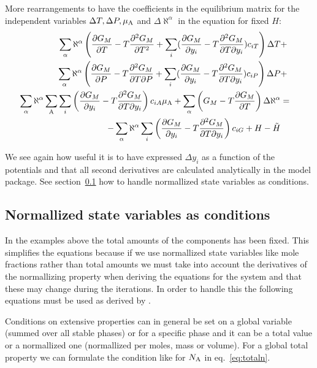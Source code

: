 \documentclass[12pt]{article}
\begin{document}
More rearrangements to have the coefficients in the equilibrium matrix
for the independent variables $\Delta T, \Delta P, \mu_{\rm A}$ and
$\Delta \aleph^{\alpha}$ in the equation for fixed $H$:
\begin{eqnarray}
\sum_{\alpha}\aleph^{\alpha}
\left(\frac{\partial G_M}{\partial T}-T\frac{\partial^2 G_M}{\partial T^2}+
\sum_i(\frac{\partial G_M}{\partial y_i}-T\frac{\partial^2 G_M}{\partial T\partial y_i}) c_{iT}\right)\Delta T&+&\nonumber\\
\sum_{\alpha}\aleph^{\alpha}
\left(\frac{\partial G_M}{\partial P}-T\frac{\partial^2 G_M}{\partial T\partial P}+
\sum_i(\frac{\partial G_M}{\partial y_i}-T\frac{\partial^2 G_M}{\partial T\partial y_i})c_{iP}\right)\Delta P&+&\nonumber\\
\sum_{\alpha}\aleph^{\alpha}
\sum_{\rm A}\sum_i\left(\frac{\partial G_M}{\partial y_i}-T\frac{\partial^2 G_M}{\partial T\partial y_i}\right)c_{iA}\mu_{\rm A}+
\sum_{\alpha}\left(G_M - T \frac{\partial G_M}{\partial T}\right) \Delta\aleph^{\alpha} &=&\nonumber\\
-\sum_{\alpha}\aleph^{\alpha}
\sum_i\left(\frac{\partial G_M}{\partial y_i}-T\frac{\partial^2 G_M}{\partial T\partial y_i}\right)c_{iG}+ H - \tilde H \label{eq:hcond3}
\end{eqnarray}

We see again how useful it is to have expressed $\Delta y_i$ as a
function of the potentials and that all second derivatives are
calculated analytically in the model package.  See
section~\ref{sc:norm} how to handle normallized state variables as
conditions.


\subsection{Normallized state variables as conditions}\label{sc:norm}

In the examples above the total amounts of the components has been
fixed.  This simplifies the equations because if we use normallized
state variables like mole fractions rather than total amounts we must
take into account the derivatives of the normallizing property when
deriving the equations for the system and that these may change during
the iterations.  In order to handle this the following equations must
be used as derived by \cite{84Jan}.

Conditions on extensive properties can in general be set on a global
variable (summed over all stable phases) or for a specific phase and
it can be a total value or a normallized one (normallized per moles,
mass or volume).  For a global total property we can formulate the
condition like for $N_{\rm A}$ in eq.~\ref{eq:totaln}.
\end{document}
